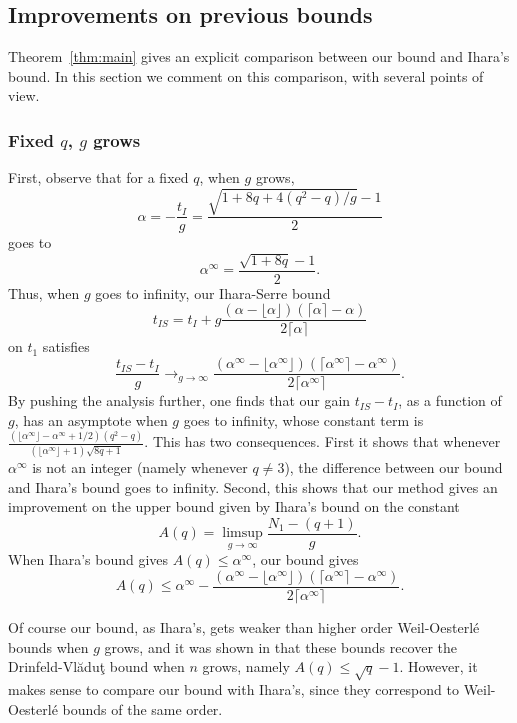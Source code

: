 \documentclass{amsart}
\newcommand{\newlowerbound}{t_{IS}}
\begin{document}
\subsection{Improvements on previous bounds}\label{sEtudeGain}
Theorem~\ref{thm:main} gives an explicit comparison between our bound and Ihara's bound.
In this section we comment on this comparison, with several points of view.

\subsubsection{Fixed $q$, $g$ grows}\label{sec:qfix}
First, observe that for a fixed $q$, when $g$ grows, 
\[
\alpha = -\frac{t_I}{g} = \frac{\sqrt{1+8q+4(q^2-q)/g}-1}{2}
\]
goes to 
\[
\alpha^\infty = \frac{\sqrt{1+8q}-1}{2}.
\]
Thus, when $g$ goes to infinity, our Ihara-Serre bound 
\begin{equation}
\newlowerbound=t_I + g\frac{(\alpha - \lfloor \alpha \rfloor)(\lceil \alpha \rceil -\alpha)}{2\lceil \alpha \rceil}
\end{equation}
on $t_1$ satisfies
\[
\frac{\newlowerbound-t_I}{g} \to_{g\to \infty} \frac{(\alpha^\infty - \lfloor \alpha^\infty \rfloor)(\lceil \alpha^\infty \rceil -\alpha^\infty)}{2\lceil \alpha^\infty \rceil}.
\]
By pushing the analysis further, one finds that our gain $\newlowerbound-t_I$, as a function of $g$, has an asymptote when $g$ goes to infinity, whose constant term is $\displaystyle{\frac{(\lfloor \alpha^\infty \rfloor  - \alpha^\infty +1/2)(q^2-q)}{(\lfloor \alpha^\infty \rfloor + 1)\sqrt{8q+1}}}$. 
This has two consequences. 
First it shows that whenever $\alpha^\infty$ is not an integer (namely whenever $q \neq 3$), the difference between our bound and Ihara's bound goes to infinity. 
Second, this shows that our method gives an improvement on the upper bound given by Ihara's bound on the constant 
\[A(q) = \limsup_{g\to\infty} \frac{N_1 - (q+1)}{g}. \]
When Ihara's bound gives $A(q) \leq \alpha^\infty$, our bound gives
\begin{equation}
A(q) \leq \alpha^\infty - \frac{(\alpha^\infty - \lfloor \alpha^\infty \rfloor)(\lceil \alpha^\infty \rceil -\alpha^\infty)}{2\lceil \alpha^\infty \rceil}.
\end{equation}

Of course our bound, as Ihara's, gets weaker than higher order Weil-Oesterl\'e bounds when $g$ grows, and it was shown in \cite{HP19} that these bounds recover the Drinfeld-Vl{\u a}du\c t \cite{VD} bound  when $n$ grows, namely $A(q) \leq \sqrt{q} - 1$.
However, it makes sense to compare our bound with Ihara's, since they correspond to Weil-Oesterl\'e bounds of the same order.
\end{document}
